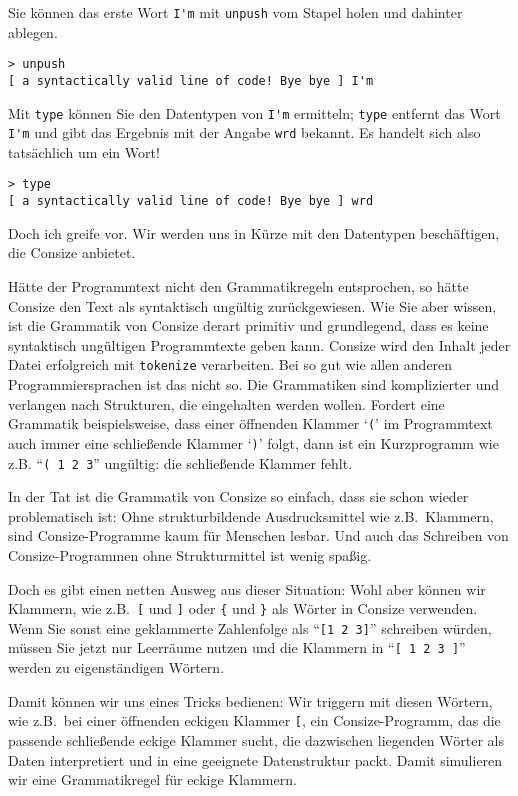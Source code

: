 Sie können das erste Wort \verb|I'm| mit \verb|unpush| vom Stapel holen und dahinter ablegen.

\begin{verbatim}
> unpush
[ a syntactically valid line of code! Bye bye ] I'm
\end{verbatim}

Mit \verb|type| können Sie den Datentypen von \verb|I'm| ermitteln; \verb|type| entfernt das Wort \verb|I'm| und gibt das Ergebnis mit der Angabe \verb|wrd| bekannt. Es handelt sich also tatsächlich um ein Wort!

\begin{verbatim}
> type
[ a syntactically valid line of code! Bye bye ] wrd
\end{verbatim}

Doch ich greife vor. Wir werden uns in Kürze mit den Datentypen be\-schäf\-ti\-gen, die Consize anbietet.

Hätte der Programmtext nicht den Grammatikregeln entsprochen, so hätte Consize den Text als syntaktisch ungültig zurückgewiesen. Wie Sie aber wissen, ist die Grammatik von Consize derart primitiv und grundlegend, dass es keine syntaktisch ungültigen Programmtexte geben kann. Consize wird den Inhalt jeder Datei erfolgreich mit \verb|tokenize| verarbeiten. Bei so gut wie allen anderen Programmiersprachen ist das nicht so. Die Grammatiken sind komplizierter und verlangen nach Strukturen, die eingehalten werden wollen. Fordert eine Grammatik beispielsweise, dass einer öffnenden Klammer `\verb|(|' im Programmtext auch immer eine schließende Klammer `\verb|)|' folgt, dann ist ein Kurzprogramm wie z.B. "`\verb|( 1 2 3|"' ungültig: die schließende Klammer fehlt.

In der Tat ist die Grammatik von Consize so einfach, dass sie schon wieder problematisch ist: Ohne strukturbildende Ausdrucksmittel wie z.B.\ Klammern, sind Consize-Programme kaum für Menschen lesbar. Und auch das Schreiben von Consize-Programmen ohne Strukturmittel ist wenig spaßig.

Doch es gibt einen netten Ausweg aus dieser Situation: Wohl aber können wir Klammern, wie z.B.\ \verb|[| und \verb|]| oder \verb|{| und \verb|}| als Wörter in Consize verwenden. Wenn Sie sonst eine geklammerte Zahlenfolge als "`\verb|[1 2 3]|"' schreiben würden, müssen Sie jetzt nur Leerräume nutzen und die Klammern in "`\verb|[ 1 2 3 ]|"' werden zu eigenständigen Wörtern.

Damit können wir uns eines Tricks bedienen: Wir triggern mit diesen Wörtern, wie z.B.\ bei einer öffnenden eckigen Klammer \verb|[|, ein Consize-Programm, das die passende schließende eckige Klammer sucht, die dazwischen liegenden Wörter als Daten interpretiert und in eine geeignete Datenstruktur packt. Damit simulieren wir eine Grammatikregel für eckige Klammern.

